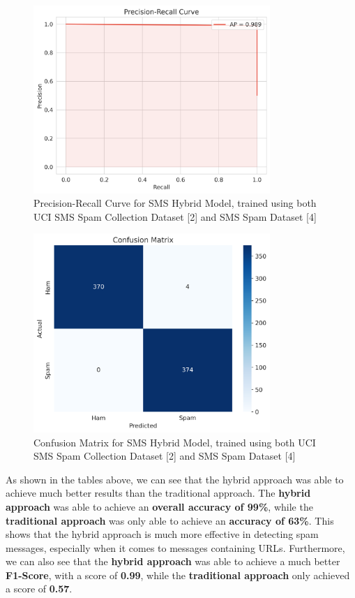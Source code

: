 \documentclass{article}
\begin{document}
\begin{figure}[htbp]
    \centering
    \includegraphics[width=0.8\textwidth]{../analysis/sms/hybrid/precision_recall_curve.png}
    \caption{Precision-Recall Curve for SMS Hybrid Model, trained using both UCI SMS Spam Collection Dataset [2] and SMS Spam Dataset [4]}
    \label{fig:precision_recall_curve_7}
\end{figure}

\begin{figure}[htbp]
    \centering
    \includegraphics[width=0.8\textwidth]{../analysis/sms/hybrid/confusion_matrix.png}
    \caption{Confusion Matrix for SMS Hybrid Model, trained using both UCI SMS Spam Collection Dataset [2] and SMS Spam Dataset [4]}
    \label{fig:confusion_matrix_7}
\end{figure}

\newpage

\noindent
As shown in the tables above, we can see that the hybrid approach was able to achieve much better results than the traditional approach. The \textbf{hybrid approach} was able to achieve an \textbf{overall accuracy of 99\%}, while the \textbf{traditional approach} was only able to achieve an \textbf{accuracy of 63\%}. This shows that the hybrid approach is much more effective in detecting spam messages, especially when it comes to messages containing URLs. Furthermore, we can also see that the \textbf{hybrid approach} was able to achieve a much better \textbf{F1-Score}, with a score of \textbf{0.99}, while the \textbf{traditional approach} only achieved a score of \textbf{0.57}.
\end{document}
